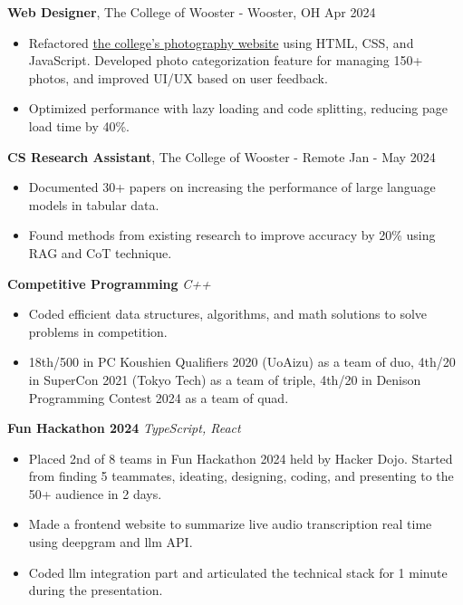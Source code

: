\documentclass[letterpaper,12pt]{article}
\begin{document}
\textbf{Web Designer}\textnormal{, The College of Wooster - Wooster, OH} \hfill \textnormal{Apr 2024}\\
\begin{itemize}
    \item Refactored \href{https://mmproject-three.vercel.app/}{the college's photography website} using HTML, CSS, and JavaScript. Developed photo categorization feature for managing 150+ photos, and improved UI/UX based on user feedback.
    \item Optimized performance with lazy loading and code splitting, reducing page load time by 40\%.
\end{itemize}

\textbf{CS Research Assistant}\textnormal{, The College of Wooster - Remote} \hfill \textnormal{Jan - May 2024}\\
\begin{itemize}
    \item Documented 30+ papers on increasing the performance of large language models in tabular data.
    \item Found methods from existing research to improve accuracy by 20\% using RAG and CoT technique.
\end{itemize}

\textbf{Competitive Programming}
\textit{C++}
\begin{itemize}
    \item Coded efficient data structures, algorithms, and math solutions to solve problems in competition.
    \item 18th/500 in PC Koushien Qualifiers 2020 (UoAizu) as a team of duo, 4th/20 in SuperCon 2021 (Tokyo Tech) as a team of triple, 4th/20 in Denison Programming Contest 2024 as a team of quad.
\end{itemize}

\textbf{Fun Hackathon 2024}
\href{https://echodelphi.github.io/}{\faGlobe}
\href{https://github.com/echodelphi/echodelphi.github.io}{\faGithub}
\textit{TypeScript, React}
\begin{itemize}
    \item Placed 2nd of 8 teams in Fun Hackathon 2024 held by Hacker Dojo. Started from finding 5 teammates, ideating, designing, coding, and presenting to the 50+ audience in 2 days.
    \item Made a frontend website to summarize live audio transcription real time using deepgram and llm API.
    \item Coded llm integration part and articulated the technical stack for 1 minute during the presentation.
\end{itemize}
\end{document}
